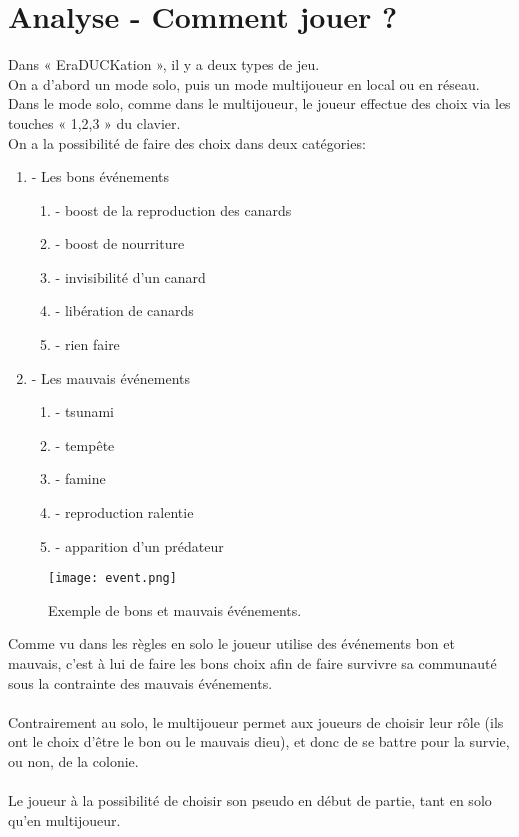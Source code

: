﻿\documentclass[12pt,a4paper,twoside]{article}
\begin{document}
\section{Analyse - Comment jouer ?}

Dans « EraDUCKation », il y a deux types de jeu.
\\
On a d'abord un mode solo, puis un mode multijoueur en local ou en réseau. 
\\
Dans le mode solo, comme dans le multijoueur, le joueur effectue des choix via les touches « 1,2,3 » du clavier.
\\
On a la possibilité de faire des choix dans deux catégories:
\begin{enumerate}
\item- Les bons événements
\begin{enumerate}
\item- boost de la reproduction des canards
\item- boost de nourriture
\item- invisibilité d'un canard
\item- libération de canards
\item- rien faire
\end{enumerate}
\item- Les mauvais événements
\begin{enumerate}
\item- tsunami
\item- tempête
\item- famine
\item- reproduction ralentie
\item- apparition d'un prédateur
\end{enumerate}
\end{enumerate}
\begin{figure}[h]
\centering
\texttt{[image: event.png]}
\caption{Exemple de bons et mauvais événements.}
\end{figure}
Comme vu dans les règles en solo le joueur utilise des événements bon et mauvais,
c'est à lui de faire les bons choix afin de faire survivre sa communauté sous la contrainte des mauvais événements.
\\ \\
Contrairement au solo, le multijoueur permet aux joueurs de choisir leur rôle (ils ont le choix d'être le bon ou le mauvais dieu), et donc de se battre pour la survie, ou non, de la colonie.
\\ \\
Le joueur à la possibilité de choisir son pseudo en début de partie, tant en solo qu'en multijoueur.
\end{document}
